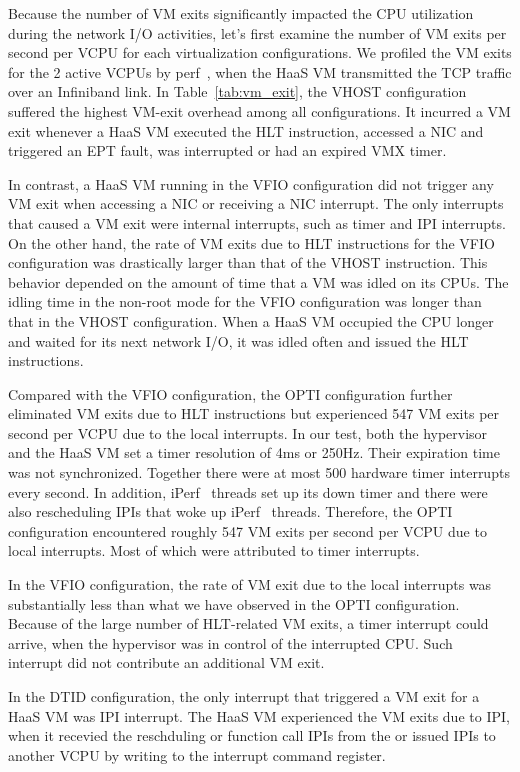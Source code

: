 Because the number of VM exits significantly impacted the CPU
utilization during the network I/O activities, let's first
examine the number of VM exits per second per VCPU for each
virtualization configurations. We profiled the VM exits for
the 2 active VCPUs by perf~\cite{perf}, when the HaaS VM
transmitted the TCP traffic over an Infiniband link. In
Table~\ref{tab:vm_exit}, the VHOST configuration suffered the
highest VM-exit overhead among all configurations. It incurred
a VM exit whenever a HaaS VM executed the HLT instruction,
accessed a NIC and triggered an EPT fault, was interrupted or
had an expired VMX timer.

In contrast, a HaaS VM running in the VFIO configuration did
not trigger any VM exit when accessing a NIC or receiving a
NIC interrupt. The only interrupts that caused a VM exit were
internal interrupts, such as timer and IPI interrupts. On the
other hand, the rate of VM exits due to HLT instructions for
the VFIO configuration was drastically larger than that of the
VHOST instruction. This behavior depended on the amount of
time that a VM was idled on its CPUs. The idling time in the
non-root mode for the VFIO configuration was longer than that
in the VHOST configuration. When a HaaS VM occupied the CPU
longer and waited for its next network I/O, it was idled often
and issued the HLT instructions.

Compared with the VFIO configuration, the OPTI configuration
further eliminated VM exits due to HLT instructions but
experienced 547 VM exits per second per VCPU due to the local
interrupts. In our test, both the hypervisor and the HaaS VM
set a timer resolution of 4ms or 250Hz. Their expiration time
was not synchronized. Together there were at most 500 hardware
timer interrupts every second. In addition, iPerf~\cite{iperf}
threads set up its down timer and there were also rescheduling
IPIs that woke up iPerf~\cite{iperf} threads. Therefore, the
OPTI configuration encountered roughly 547 VM exits per second
per VCPU due to local interrupts. Most of which were
attributed to timer interrupts.

In the VFIO configuration, the rate of VM exit due to the
local interrupts was substantially less than what we have
observed in the OPTI configuration. Because of the large
number of HLT-related VM exits, a timer interrupt could
arrive, when the hypervisor was in control of the interrupted
CPU. Such interrupt did not contribute an additional VM exit.

In the DTID configuration, the only interrupt that triggered a
VM exit for a HaaS VM was IPI interrupt. The HaaS VM
experienced the VM exits due to IPI, when it recevied the
reschduling or function call IPIs from the \na 
or issued IPIs to another VCPU by writing to the interrupt
command register.

